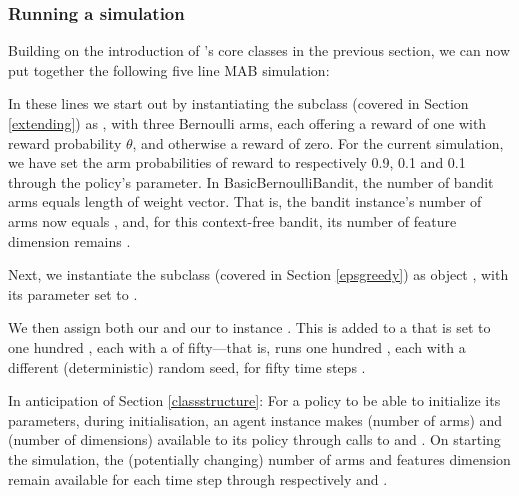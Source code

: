 \documentclass{jss}
\begin{document}
\subsubsection{Running a simulation}

Building on the introduction of 's core classes in the previous section, we can now put together the following five line MAB simulation:

\begin{CodeChunk}
\end{CodeChunk}

In these lines we start out by instantiating the  subclass  (covered in Section \ref{extending}) as , with three Bernoulli arms, each offering a reward of one with reward probability $\theta$, and otherwise a reward of zero. For the current simulation, we have set the  arm probabilities of reward to respectively 0.9, 0.1 and 0.1 through the policy's  parameter. In BasicBernoulliBandit, the number of bandit arms equals length of weight vector. That is, the bandit instance's number of arms  now equals , and, for this context-free bandit, its number of feature dimension  remains .

Next, we instantiate the  subclass  (covered in Section \ref{epsgreedy}) as object , with its  parameter set to .

We then assign both our  and our  to  instance . This  is added to a  that is set to one hundred , each with a  of fifty---that is,  runs one hundred , each with a different (deterministic) random seed, for fifty time steps .

In anticipation of Section \ref{classstructure}: For a policy to be able to initialize its parameters, during initialisation, an agent instance makes  (number of arms) and  (number of dimensions) available to its policy through calls to  and . On starting the simulation, the (potentially changing) number of arms and features dimension remain available for each time step  through respectively  and .
\end{document}
